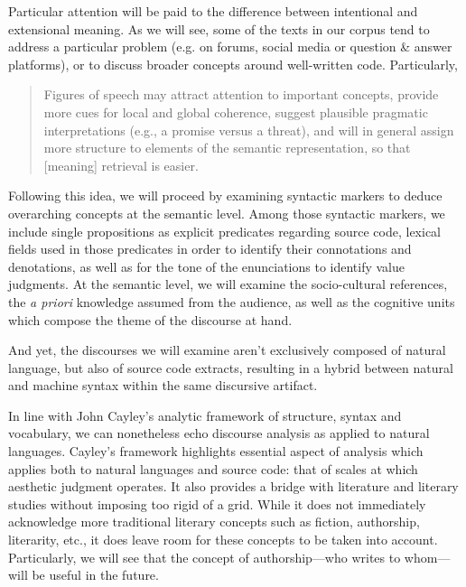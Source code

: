 Particular attention will be paid to the difference between intentional and extensional meaning\cite{dijk_strategies_1983}. As we will see, some of the texts in our corpus tend to address a particular problem (e.g. on forums, social media or question \& answer platforms), or to discuss broader concepts around well-written code. Particularly,

\begin{quote}
  Figures of speech may attract attention to important concepts, provide more cues for local and global coherence, suggest plausible pragmatic interpretations (e.g., a promise versus a threat), and will in general assign more structure to elements of the semantic representation, so that [meaning] retrieval is easier.\cite{dijk_strategies_1983}
\end{quote}

Following this idea, we will proceed by examining syntactic markers to deduce  overarching concepts at the semantic level. Among those syntactic markers, we include single propositions as explicit predicates regarding source code, lexical fields used in those predicates in order to identify their connotations and denotations, as well as for the tone of the enunciations to identify value judgments. At the semantic level, we will examine the socio-cultural references, the \emph{a priori} knowledge assumed from the audience, as well as the cognitive units which compose the theme of the discourse at hand.

And yet, the discourses we will examine aren't exclusively composed of natural language, but also of source code extracts, resulting in a hybrid between natural and machine syntax within the same discursive artifact.

In line with John Cayley's analytic framework of structure, syntax and vocabulary\cite{cayley_code_2012}, we can nonetheless echo discourse analysis as applied to natural languages. Cayley's framework highlights essential aspect of analysis which applies both to natural languages and source code: that of scales at which aesthetic judgment operates. It also provides a bridge with literature and literary studies without imposing too rigid of a grid. While it does not immediately acknowledge more traditional literary concepts such as fiction, authorship, literarity, etc., it does leave room for these concepts to be taken into account.  Particularly, we will see that the concept of authorship—who writes to whom—will be useful in the future.

